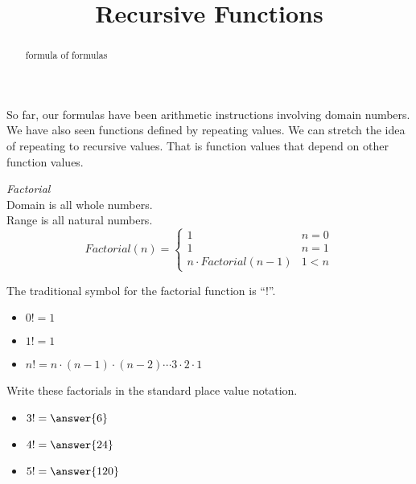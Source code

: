 \documentclass{ximera}
\title{Recursive Functions}
\begin{document}
\begin{abstract}
formula of formulas
\end{abstract}
\maketitle



So far, our formulas have been arithmetic instructions involving domain numbers. We have also seen functions defined by repeating values. We can stretch the idea of repeating to recursive values.  That is function values that depend on other function values.









\begin{example}  \textit{Factorial} \\



Domain is all whole numbers. \\
Range is all natural numbers. \\




\[
Factorial(n) = 
\begin{cases}
  1 & n = 0 \\
  1 & n = 1 \\ 
  n \cdot Factorial(n-1) & 1 < n
\end{cases}
\]

The traditional symbol for the factorial function is ``!''.


\begin{itemize}
  \item $0! = 1$
  \item $1! = 1$
  \item $n! = n \cdot (n-1) \cdot (n-2) \cdots 3 \cdot 2 \cdot 1$
\end{itemize}





\begin{question} Write these factorials in the standard place value notation.


\begin{itemize}
\item $3! = \answer{6}$
\item $4! = \answer{24}$
\item $5! = \answer{120}$
\end{itemize}


\end{question}



\end{example}
\end{document}
